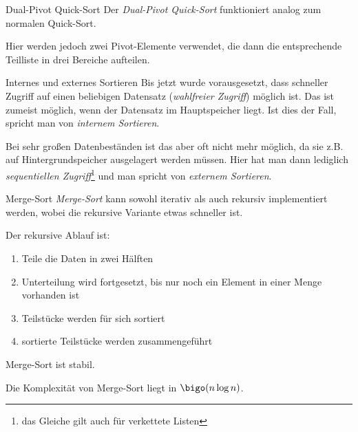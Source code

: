 \begin{defi}{Dual-Pivot Quick-Sort}
    Der \emph{Dual-Pivot Quick-Sort} funktioniert analog zum normalen Quick-Sort.

    Hier werden jedoch zwei Pivot-Elemente verwendet, die dann die entsprechende Teilliste in drei Bereiche aufteilen.
\end{defi}

\begin{defi}{Internes und externes Sortieren}
    Bis jetzt wurde vorausgesetzt, dass schneller Zugriff auf einen beliebigen Datensatz (\emph{wahlfreier Zugriff}) möglich ist.
    Das ist zumeist möglich, wenn der Datensatz im Hauptspeicher liegt.
    Ist dies der Fall, spricht man von \emph{internem Sortieren}.

    Bei sehr großen Datenbeständen ist das aber oft nicht mehr möglich, da sie z.B. auf Hintergrundspeicher ausgelagert werden müssen.
    Hier hat man dann lediglich \emph{sequentiellen Zugriff}\footnote{das Gleiche gilt auch für verkettete Listen} und man spricht von \emph{externem Sortieren}.
\end{defi}

\begin{algo}{Merge-Sort}
    \emph{Merge-Sort} kann sowohl iterativ als auch rekursiv implementiert werden, wobei die rekursive Variante etwas schneller ist.

    Der rekursive Ablauf ist:
    \begin{enumerate}
        \item Teile die Daten in zwei Hälften
        \item Unterteilung wird fortgesetzt, bis nur noch ein Element in einer Menge vorhanden ist
        \item Teilstücke werden für sich sortiert
        \item sortierte Teilstücke werden zusammengeführt
    \end{enumerate}

    Merge-Sort ist stabil.

    Die Komplexität von Merge-Sort liegt in $\bigo(n \log n)$.
\end{algo}

